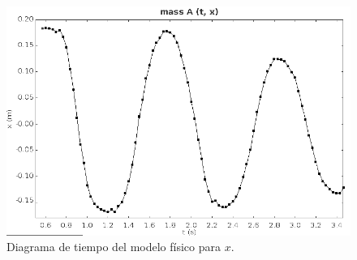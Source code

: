 \begin{figure}[h]
 \centering
 \includegraphics[scale=0.3]{./img/tracker_poc_timeplot_x.png}
 \caption{Diagrama de tiempo del modelo físico para $x$.}
 \label{fig: tracker time diagram x}
\end{figure}
